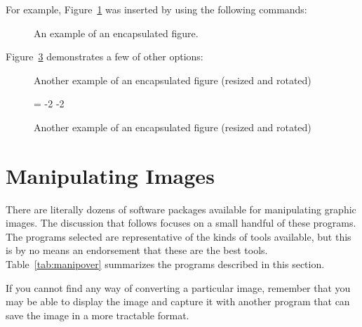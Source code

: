 For example, Figure~\ref{fig:psfigure} was inserted by 
using the following commands:

\begin{shortexample}
\begin{figure}
  \caption{An example of an encapsulated figure.}
  \label{fig:psfigure}
\end{figure}
\end{shortexample}


Figure~\ref{fig:psfigurerot} demonstrates a few of other 
 options:

\begin{shortexample}
\begin{figure}
  \caption{Another example of an encapsulated figure 
           (resized and rotated)}
  \label{fig:psfigurerot}
\end{figure}
\end{shortexample}

\begin{figure}
=\textwidth
\advance{}-2\fboxrule
\advance{}-2\fboxsep
{}
\caption{Another example of an encapsulated figure (resized and rotated)}
\label{fig:psfigurerot}
\end{figure}
\makeatletter
\@scalefirstfalse
\makeatother

\section{Manipulating Images}
\label{sec:picconv}

There are literally dozens of software packages available for
manipulating graphic images.  The 
discussion that follows focuses on a
small handful of these programs.  The programs selected are
representative of the kinds of tools available, but this is by no means
an endorsement that these are the best tools.  
Table~\ref{tab:manipover} summarizes the programs described in this
section.  

If you cannot find any way of converting a particular image, remember
that you may be able to display the image and capture it with another
program that can save the image in a more tractable format.


